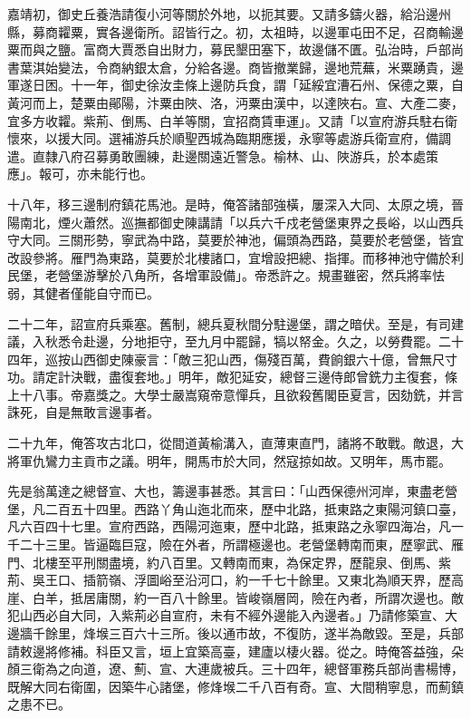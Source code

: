 嘉靖初，御史丘養浩請復小河等關於外地，以扼其要。又請多鑄火器，給沿邊州縣，募商糶粟，實各邊衛所。詔皆行之。初，太祖時，以邊軍屯田不足，召商輸邊粟而與之鹽。富商大賈悉自出財力，募民墾田塞下，故邊儲不匱。弘治時，戶部尚書葉淇始變法，令商納銀太倉，分給各邊。商皆撤業歸，邊地荒蕪，米粟踴貴，邊軍遂日困。十一年，御史徐汝圭條上邊防兵食，謂「延綏宜漕石州、保德之粟，自黃河而上，楚粟由鄖陽，汴粟由陜、洛，沔粟由漢中，以達陜右。宣、大產二麥，宜多方收糶。紫荊、倒馬、白羊等關，宜招商賃車運」。又請「以宣府游兵駐右衛懷來，以援大同。選補游兵於順聖西城為臨期應援，永寧等處游兵衛宣府，備調遣。直隸八府召募勇敢團練，赴邊關遠近警急。榆林、山、陜游兵，於本處策應」。報可，亦未能行也。

十八年，移三邊制府鎮花馬池。是時，俺答諸部強橫，屢深入大同、太原之境，晉陽南北，煙火蕭然。巡撫都御史陳講請「以兵六千戍老營堡東界之長峪，以山西兵守大同。三關形勢，寧武為中路，莫要於神池，偏頭為西路，莫要於老營堡，皆宜改設參將。雁門為東路，莫要於北樓諸口，宜增設把總、指揮。而移神池守備於利民堡，老營堡游擊於八角所，各增軍設備」。帝悉許之。規畫雖密，然兵將率怯弱，其健者僅能自守而已。

二十二年，詔宣府兵乘塞。舊制，總兵夏秋間分駐邊堡，謂之暗伏。至是，有司建議，入秋悉令赴邊，分地拒守，至九月中罷歸，犒以帑金。久之，以勞費罷。二十四年，巡按山西御史陳豪言：「敵三犯山西，傷殘百萬，費餉銀六十億，曾無尺寸功。請定計決戰，盡復套地。」明年，敵犯延安，總督三邊侍郎曾銑力主復套，條上十八事。帝嘉獎之。大學士嚴嵩窺帝意憚兵，且欲殺舊閣臣夏言，因劾銑，并言誅死，自是無敢言邊事者。

二十九年，俺答攻古北口，從間道黃榆溝入，直薄東直門，諸將不敢戰。敵退，大將軍仇鸞力主貢市之議。明年，開馬市於大同，然寇掠如故。又明年，馬市罷。

先是翁萬達之總督宣、大也，籌邊事甚悉。其言曰：「山西保德州河岸，東盡老營堡，凡二百五十四里。西路丫角山迤北而來，歷中北路，抵東路之東陽河鎮口臺，凡六百四十七里。宣府西路，西陽河迤東，歷中北路，抵東路之永寧四海冶，凡一千二十三里。皆逼臨巨寇，險在外者，所謂極邊也。老營堡轉南而東，歷寧武、雁門、北樓至平刑關盡境，約八百里。又轉南而東，為保定界，歷龍泉、倒馬、紫荊、吳王口、插箭嶺、浮圖峪至沿河口，約一千七十餘里。又東北為順天界，歷高崖、白羊，抵居庸關，約一百八十餘里。皆峻嶺層岡，險在內者，所謂次邊也。敵犯山西必自大同，入紫荊必自宣府，未有不經外邊能入內邊者。」乃請修築宣、大邊牆千餘里，烽堠三百六十三所。後以通市故，不復防，遂半為敵毀。至是，兵部請敕邊將修補。科臣又言，垣上宜築高臺，建廬以棲火器。從之。時俺答益強，朵顏三衛為之向道，遼、薊、宣、大連歲被兵。三十四年，總督軍務兵部尚書楊博，既解大同右衛圍，因築牛心諸堡，修烽堠二千八百有奇。宣、大間稍寧息，而薊鎮之患不已。

